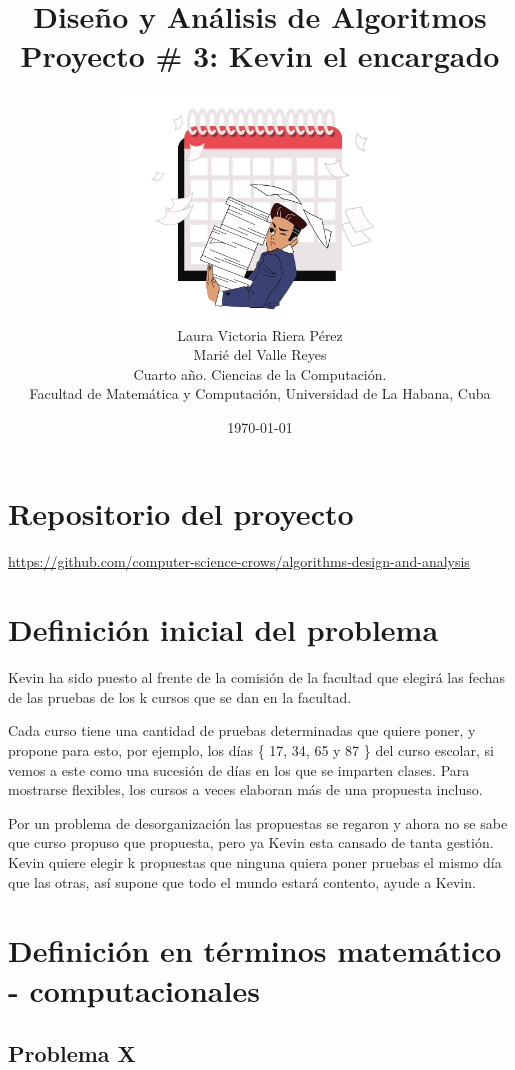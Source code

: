 \documentclass[10pt]{article} %
\title{\normalsize{Dise\~no y An\'alisis de Algoritmos }\\
	\Huge\bfseries Proyecto \# 3: Kevin el encargado \\
} %
\author{%
	\includegraphics[height=6cm]{logo.png} \vspace{1em}\\
	Laura Victoria Riera P\'erez\\
	Mari\'e del Valle Reyes \vspace{1em} \\
	\small Cuarto a\~no. Ciencias de la Computaci\'on. \\ %
	\small Facultad de Matem\'atica y Computaci\'on, Universidad de La Habana, Cuba \\ %
}
\date{\footnotesize \today } %
\begin{document}
	\maketitle
	
	
	\section{Repositorio del proyecto}
	
	\begin{center}
		\href{https://github.com/computer-science-crows/algorithms-design-and-analysis}{https://github.com/computer-science-crows/algorithms-design-and-analysis}
	\end{center}

	\section{Definici\'on inicial del problema} 

	Kevin ha sido puesto al frente de la comisión de la facultad que elegirá las fechas de las pruebas de los k cursos que se dan en la facultad.
	
	Cada curso tiene una cantidad de pruebas determinadas que quiere poner, y propone para esto, por ejemplo, los días \{ 17, 34, 65 y 87 \} del curso escolar, si vemos a este como una sucesión de días en los que se imparten clases. Para mostrarse flexibles, los cursos a veces elaboran más de una propuesta incluso.
	
	Por un problema de desorganización las propuestas se regaron y ahora no se sabe que curso propuso que propuesta, pero ya Kevin esta cansado de tanta gestión. Kevin quiere elegir k propuestas que ninguna quiera poner pruebas el mismo día que las otras, así supone que todo el mundo estará contento, ayude a Kevin.
	

	\section{Definici\'on en t\'erminos matem\'atico - computacionales}\label{section_2}
	
	
	\subsection{Problema X}
\end{document}

